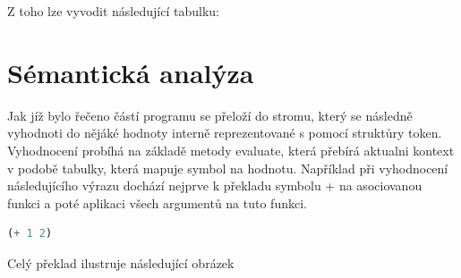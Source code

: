 \documentclass[a4paper,11pt]{article}
\begin{document}
Z toho lze vyvodit následující tabulku:
\begin{table}
\centering
{}
\caption{My caption}
\label{my-label}
\end{table}

\newpage{}

\section{Sémantická analýza}
Jak jíž bylo řečeno částí programu se přeloží do stromu, který se následně vyhodnoti do nějáké hodnoty interně reprezentované s pomocí struktůry token. Vyhodnocení probíhá na základě metody evaluate, která přebírá aktualni kontext v podobě tabulky, která mapuje symbol na hodnotu. Například při vyhodnocení následujícího výrazu dochází nejprve k překladu symbolu + na asociovanou funkci a poté aplikaci všech argumentů na tuto funkci.
\begin{lstlisting}[language=lisp]
(+ 1 2) 
\end{lstlisting}
Celý překlad ilustruje následující obrázek
\end{document}
